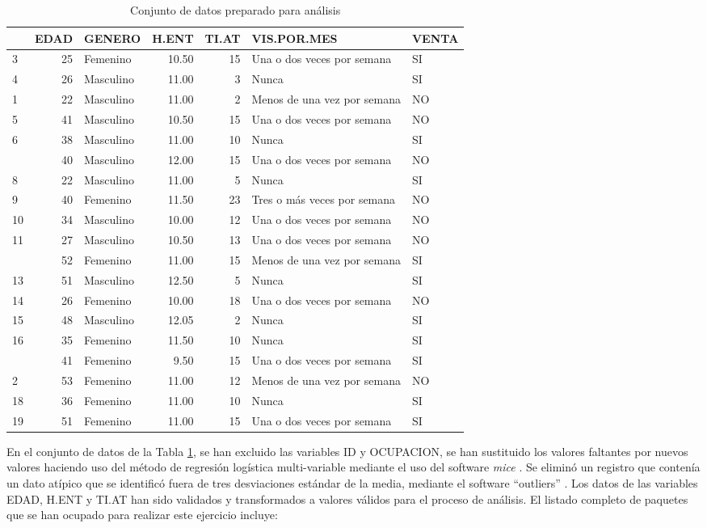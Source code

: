 \documentclass[]{book}
\begin{document}
\begin{table}

\caption{\label{tab:datos-listos}Conjunto de datos preparado para análisis}
\centering
\begin{tabular}[t]{lrlrrll}
\toprule
  & EDAD & GENERO & H.ENT & TI.AT & VIS.POR.MES & VENTA\\
\midrule
3 & 25 & Femenino & 10.50 & 15 & Una o dos veces por semana & SI\\
4 & 26 & Masculino & 11.00 & 3 & Nunca & SI\\
1 & 22 & Masculino & 11.00 & 2 & Menos de una vez por semana & NO\\
5 & 41 & Masculino & 10.50 & 15 & Una o dos veces por semana & NO\\
6 & 38 & Masculino & 11.00 & 10 & Nunca & SI\\
\addlinespace
7 & 40 & Masculino & 12.00 & 15 & Una o dos veces por semana & NO\\
8 & 22 & Masculino & 11.00 & 5 & Nunca & SI\\
9 & 40 & Femenino & 11.50 & 23 & Tres o más veces por semana & NO\\
10 & 34 & Masculino & 10.00 & 12 & Una o dos veces por semana & NO\\
11 & 27 & Masculino & 10.50 & 13 & Una o dos veces por semana & NO\\
\addlinespace
12 & 52 & Femenino & 11.00 & 15 & Menos de una vez por semana & SI\\
13 & 51 & Masculino & 12.50 & 5 & Nunca & SI\\
14 & 26 & Femenino & 10.00 & 18 & Una o dos veces por semana & NO\\
15 & 48 & Masculino & 12.05 & 2 & Nunca & SI\\
16 & 35 & Femenino & 11.50 & 10 & Nunca & SI\\
\addlinespace
17 & 41 & Femenino & 9.50 & 15 & Una o dos veces por semana & SI\\
2 & 53 & Femenino & 11.00 & 12 & Menos de una vez por semana & NO\\
18 & 36 & Femenino & 11.00 & 10 & Nunca & SI\\
19 & 51 & Femenino & 11.00 & 15 & Una o dos veces por semana & SI\\
\bottomrule
\end{tabular}
\end{table}

En el conjunto de datos de la Tabla \ref{tab:datos-listos}, se han
excluido las variables ID y OCUPACION, se han sustituido los valores
faltantes por nuevos valores haciendo uso del método de regresión
logística multi-variable mediante el uso del software \emph{mice}
\citep{mice2011}. Se eliminó un registro que contenía un dato atípico
que se identificó fuera de tres desviaciones estándar de la media,
mediante el software ``outliers'' \citep{R-outliers}. Los datos de las
variables EDAD, H.ENT y TI.AT han sido validados y transformados a
valores válidos para el proceso de análisis. El listado completo de
paquetes que se han ocupado para realizar este ejercicio incluye:
\citep[\citet{R-magrittr}, \citet{R-RCurl}, \citet{R-bookdown} and
\citet{R-rmarkdown}]{R-knitr}


\end{document}
